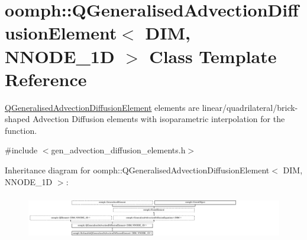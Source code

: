 \hypertarget{classoomph_1_1QGeneralisedAdvectionDiffusionElement}{}\section{oomph\+:\+:Q\+Generalised\+Advection\+Diffusion\+Element$<$ D\+IM, N\+N\+O\+D\+E\+\_\+1D $>$ Class Template Reference}
\label{classoomph_1_1QGeneralisedAdvectionDiffusionElement}


\hyperlink{classoomph_1_1QGeneralisedAdvectionDiffusionElement}{Q\+Generalised\+Advection\+Diffusion\+Element} elements are linear/quadrilateral/brick-\/shaped Advection Diffusion elements with isoparametric interpolation for the function.  




{\ttfamily \#include $<$gen\+\_\+advection\+\_\+diffusion\+\_\+elements.\+h$>$}

Inheritance diagram for oomph\+:\+:Q\+Generalised\+Advection\+Diffusion\+Element$<$ D\+IM, N\+N\+O\+D\+E\+\_\+1D $>$\+:\begin{figure}[H]
\begin{center}
\leavevmode
\includegraphics[height=1.960784cm]{classoomph_1_1QGeneralisedAdvectionDiffusionElement}
\end{center}
\end{figure}
